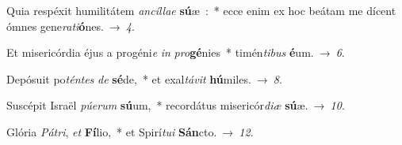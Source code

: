 ﻿\item Quia respéxit humilitátem \emph{an}\-\emph{cíl}\-\emph{lae} \textbf{sú}æ~:~*
ecce enim ex hoc beátam me dícent ómnes gene\emph{ra}\emph{ti}\textbf{ó}nes.~→~\emph{4}.
\item Et misericórdia éjus a progéni\emph{e} \emph{in} \emph{pro}\textbf{gé}nies~*
timén\emph{ti}\-\emph{bus} \textbf{é}um.~→~\emph{6}.
\item Depósuit po\emph{tén}\-\emph{tes} \emph{de} \textbf{sé}de,~*
et exal\emph{tá}\-\emph{vit} \textbf{hú}miles.~→~\emph{8}.
\item Suscépit Israël \emph{pú}\-\emph{e}\-\emph{rum} \textbf{sú}um,~*
recordátus misericór\emph{di}\-\emph{æ} \textbf{sú}æ.~→~\emph{10}.
\item Glória \emph{Pá}\-\emph{tri}, \emph{et} \textbf{Fí}lio,~*
et Spirí\emph{tu}\-\emph{i} \textbf{Sán}cto.~→~\emph{12}.
